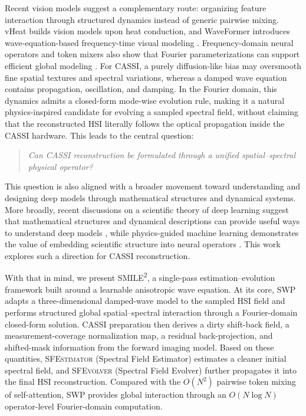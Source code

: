 \documentclass[letterpaper]{article} %
\newcommand{\smiletwo}{SMILE\textsuperscript{2}}
\newcommand{\sfestimator}{\textsc{SFEstimator}}
\newcommand{\sfevolver}{\textsc{SFEvolver}}
\newcommand{\swp}{\textsc{SWP}}
\begin{document}
Recent vision models suggest a complementary route: organizing feature interaction through structured dynamics instead of generic pairwise mixing.
vHeat builds vision models upon heat conduction, and WaveFormer introduces wave-equation-based frequency-time visual modeling \cite{wang2024vheat,shu2026waveformer}.
Frequency-domain neural operators and token mixers also show that Fourier parameterizations can support efficient global modeling \cite{li2021fno,guibas2022afno,rao2021gfnet,leethorp2022fnet}.
For CASSI, a purely diffusion-like bias may oversmooth fine spatial textures and spectral variations, whereas a damped wave equation contains propagation, oscillation, and damping.
In the Fourier domain, this dynamics admits a closed-form mode-wise evolution rule, making it a natural physics-inspired candidate for evolving a sampled spectral field, without claiming that the reconstructed HSI literally follows the optical propagation inside the CASSI hardware.
This leads to the central question:

\begin{quote}
\centering
\textit{Can CASSI reconstruction be formulated through a unified spatial--spectral physical operator?}
\end{quote}

This question is also aligned with a broader movement toward understanding and designing deep models through mathematical structures and dynamical systems.
More broadly, recent discussions on a scientific theory of deep learning suggest that mathematical structures and dynamical descriptions can provide useful ways to understand deep models \cite{simon2026scientifictheorydeeplearning}, while physics-guided machine learning demonstrates the value of embedding scientific structure into neural operators \cite{karniadakis2021piml,willard2022scientificknowledge,weinan2017dynamicalsystems}.
This work explores such a direction for CASSI reconstruction.

With that in mind, we present \smiletwo{}, a single-pass estimation--evolution framework built around a learnable anisotropic wave equation.
At its core, \swp{} adapts a three-dimensional damped-wave model to the sampled HSI field and performs structured global spatial--spectral interaction through a Fourier-domain closed-form solution.
CASSI preparation then derives a dirty shift-back field, a measurement-coverage normalization map, a residual back-projection, and shifted-mask information from the forward imaging model.
Based on these quantities, \sfestimator{} (Spectral Field Estimator) estimates a cleaner initial spectral field, and \sfevolver{} (Spectral Field Evolver) further propagates it into the final HSI reconstruction.
Compared with the \(O(N^2)\) pairwise token mixing of self-attention, \swp{} provides global interaction through an \(O(N\log N)\) operator-level Fourier-domain computation.
\end{document}
